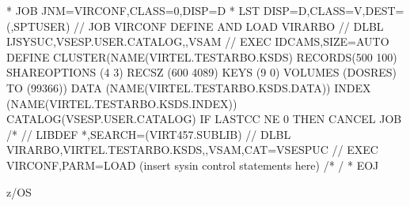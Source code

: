 \documentclass[letterpaper,10pt,english]{sphinxmanual}
\begin{document}
\begin{sphinxVerbatim}[commandchars=\\\{\}]
* \PYGZdl{}\PYGZdl{} JOB JNM=VIRCONF,CLASS=0,DISP=D
* \PYGZdl{}\PYGZdl{} LST DISP=D,CLASS=V,DEST=(,SPTUSER)
// JOB VIRCONF DEFINE AND LOAD VIRARBO
// DLBL IJSYSUC,\PYGZsq{}VSESP.USER.CATALOG\PYGZsq{},,VSAM
// EXEC IDCAMS,SIZE=AUTO
        DEFINE CLUSTER(NAME(VIRTEL.TESTARBO.KSDS) \PYGZhy{}
              RECORDS(500 100) SHAREOPTIONS (4 3) \PYGZhy{}
              RECSZ (600 4089) KEYS (9 0) \PYGZhy{}
              VOLUMES (DOSRES) TO (99366))\PYGZhy{}
        DATA (NAME(VIRTEL.TESTARBO.KSDS.DATA)) \PYGZhy{}
        INDEX (NAME(VIRTEL.TESTARBO.KSDS.INDEX)) \PYGZhy{}
              CATALOG(VSESP.USER.CATALOG)
IF LASTCC NE 0 THEN CANCEL JOB
/*
// LIBDEF *,SEARCH=(VIRT457.SUBLIB)
// DLBL VIRARBO,\PYGZsq{}VIRTEL.TESTARBO.KSDS\PYGZsq{},,VSAM,CAT=VSESPUC
// EXEC VIRCONF,PARM=\PYGZsq{}LOAD\PYGZsq{}
        (insert sysin control statements here)
/*
/\PYGZam{}
* \PYGZdl{}\PYGZdl{} EOJ
\end{sphinxVerbatim}


z/OS
\end{document}
